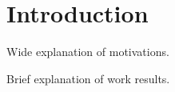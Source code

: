 \section{Introduction}
    Wide explanation of motivations.

    Brief explanation of work results.
